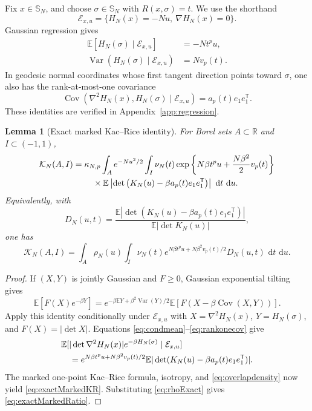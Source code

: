 \documentclass[11pt,reqno]{amsart}
\numberwithin{equation}{section}
\theoremstyle{plain}
\newtheorem{lemma}[lemma]{Lemma}
\theoremstyle{definition}
\theoremstyle{remark}
\newcommand{\SN}{\mathbb{S}_N}
\newcommand{\E}{\mathbb E}
\newcommand{\R}{\mathbb R}
\newcommand{\1}{\mathbf 1}
\newcommand{\dd}{\,\mathrm d}
\begin{document}
Fix \(x\in\SN\), and choose \(\sigma\in\SN\) with
\(R(x,\sigma)=t\).  We use the shorthand
\[
 \mathcal E_{x,u}=\{H_N(x)=-Nu,\ \nabla H_N(x)=0\}.
\]
Gaussian regression gives
\begin{align}
 \E[H_N(\sigma)\mid\mathcal E_{x,u}]
 &=-Nt^pu,\label{eq:condmean}\\
 \operatorname{Var}(H_N(\sigma)\mid\mathcal E_{x,u})
 &=Nv_p(t).\label{eq:condvar}
\end{align}
In geodesic normal coordinates whose first tangent direction points
toward \(\sigma\), one also has the rank-at-most-one covariance
\begin{equation}\label{eq:rankonecov}
 \operatorname{Cov}(\nabla^2H_N(x),H_N(\sigma)\mid\mathcal E_{x,u})
 =a_p(t)e_1e_1^{\mathsf T}.
\end{equation}
These identities are verified in Appendix~\ref{app:regression}.

\begin{lemma}[Exact marked Kac--Rice identity]\label{lem:exactmarkedKR}
For Borel sets \(A\subset\R\) and \(I\subset(-1,1)\),
\begin{align}
 \mathcal K_N(A,I)
 ={}&\kappa_{N,p}\int_A e^{-Nu^2/2}\int_I\nu_N(t)
 \exp\left\{N\beta t^pu+\frac{N\beta^2}{2}v_p(t)\right\}\notag\\
 &\quad\times
 \E\left|\det\left(K_N(u)-\beta a_p(t)e_1e_1^{\mathsf T}\right)\right|
 \,\dd t\,\dd u.
 \label{eq:exactMarkedKR}
\end{align}
Equivalently, with
\begin{equation}\label{eq:DNdefinition}
 D_N(u,t)=
 \frac{\E|\det(K_N(u)-\beta a_p(t)e_1e_1^{\mathsf T})|}
 {\E|\det K_N(u)|},
\end{equation}
one has
\begin{equation}\label{eq:exactMarkedRatio}
 \mathcal K_N(A,I)=\int_A\rho_N(u)\int_I\nu_N(t)
 e^{N\beta t^pu+N\beta^2v_p(t)/2}D_N(u,t)\,\dd t\,\dd u.
\end{equation}
\end{lemma}

\begin{proof}
If \((X,Y)\) is jointly Gaussian and \(F\geq0\), Gaussian exponential
tilting gives
\[
 \E[F(X)e^{-\beta Y}]
 =e^{-\beta\E Y+\beta^2\operatorname{Var}(Y)/2}
 \E[F(X-\beta\operatorname{Cov}(X,Y))].
\]
Apply this identity conditionally under \(\mathcal E_{x,u}\) with
\(X=\nabla^2H_N(x)\), \(Y=H_N(\sigma)\), and
\(F(X)=|\det X|\).  Equations \eqref{eq:condmean}--\eqref{eq:rankonecov}
give
\begin{align}
 &\E[|\det\nabla^2H_N(x)|e^{-\beta H_N(\sigma)}
 \mid\mathcal E_{x,u}]\notag\\
 &\quad=e^{N\beta t^pu+N\beta^2v_p(t)/2}
 \E|\det(K_N(u)-\beta a_p(t)e_1e_1^{\mathsf T})|.
 \label{eq:tiltedDet}
\end{align}
The marked one-point Kac--Rice formula, isotropy, and
\eqref{eq:overlapdensity} now yield \eqref{eq:exactMarkedKR}.
Substituting \eqref{eq:rhoExact} gives \eqref{eq:exactMarkedRatio}.
\end{proof}
\end{document}
